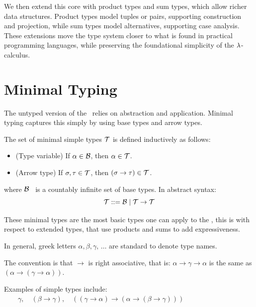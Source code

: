 We then extend this core with product types and sum types, which allow richer data structures. Product types model tuples or pairs, supporting construction and projection, while sum types model alternatives, supporting case analysis. These extensions move the type system closer to what is found in practical programming languages, while preserving the foundational simplicity of the $\lambda$-calculus.

\section{\centering Minimal Typing}
The untyped version of the \lcalc \ relies on abstraction and application. Minimal typing captures this simply by using base types and arrow types.

\begin{definition}The set of minimal simple types $\mathcal{T}$ is defined inductively as follows:
\begin{itemize}
\item (Type variable) If $\alpha \in \mathcal{B}$, then $\alpha \in \mathcal{T}$.
\item (Arrow type) If $\sigma, \tau \in \mathcal{T}$, then $(\sigma \to \tau) \in \mathcal{T}$.
\end{itemize}
where $\mathcal{B}$ \ is a countably infinite set of base types.
In abstract syntax:
\[
\mathcal{T} ::= \mathcal{B} \mid \mathcal{T} \to \mathcal{T}
\]
\end{definition}
\begin{note}
  These minimal types are the most basic types one can apply to the \lcalc, this is with respect to extended types, that use products and sums to add expressiveness.
\end{note}
\begin{notation}
  In general, greek letters $\alpha, \beta, \gamma,\, \dots$ are standard to denote type names.
\end{notation}
\begin{notation}
  The convention is that $\to$ is right associative, that is: $\alpha \to \gamma \to \alpha$ is the same as $(\alpha \to (\gamma \to \alpha))$.
\end{notation}
\begin{example}
Examples of simple types include:
\(
\qquad \gamma, \quad (\beta \to \gamma), \quad ((\gamma \to \alpha) \to (\alpha \to (\beta \to \gamma)))
\)
\end{example}

